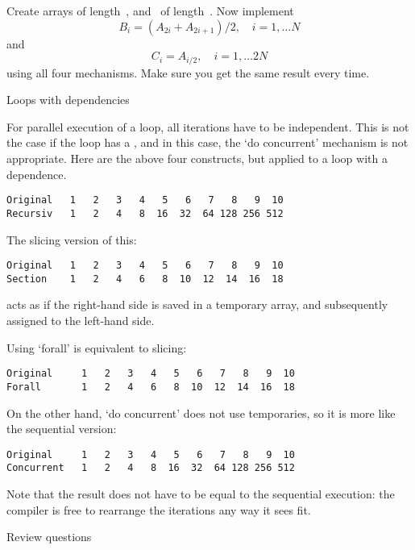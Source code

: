 \begin{exercise}
  Create arrays  of length~, and ~of length~.
  Now implement
  \[ B_i = (A_{2i}+A_{2i+1})/2,\quad i=1,\ldots N \]
  and
  \[ C_i = A_{i/2},\quad i=1,\ldots 2N \]
  using all four mechanisms. Make sure you get the same result every time.
\end{exercise}

 {Loops with dependencies}

For parallel execution of a loop, all iterations have to be independent.
This is not the case if the loop has a , and in
this case, the `do concurrent' mechanism is not appropriate.
%
Here are the above four constructs, but applied to a loop with a dependence.
%
%
\begin{lstlisting}
Original   1   2   3   4   5   6   7   8   9  10
Recursiv   1   2   4   8  16  32  64 128 256 512
\end{lstlisting}

The slicing version of this:
%
%
\begin{lstlisting}
Original   1   2   3   4   5   6   7   8   9  10
Section    1   2   4   6   8  10  12  14  16  18
\end{lstlisting}
%
acts as if the right-hand side is saved in a temporary array, and
subsequently assigned to the left-hand side.

Using `forall' is equivalent to slicing:
%
%
\begin{lstlisting}
Original     1   2   3   4   5   6   7   8   9  10
Forall       1   2   4   6   8  10  12  14  16  18
\end{lstlisting}

On the other hand, `do concurrent' does not use temporaries, so it is
more like the sequential version:
%
%
\begin{lstlisting}
Original     1   2   3   4   5   6   7   8   9  10
Concurrent   1   2   4   8  16  32  64 128 256 512
\end{lstlisting}
Note that the result does not have to be equal to the sequential
execution: the compiler is free to rearrange the iterations any way it
sees fit.

 {Review questions}

